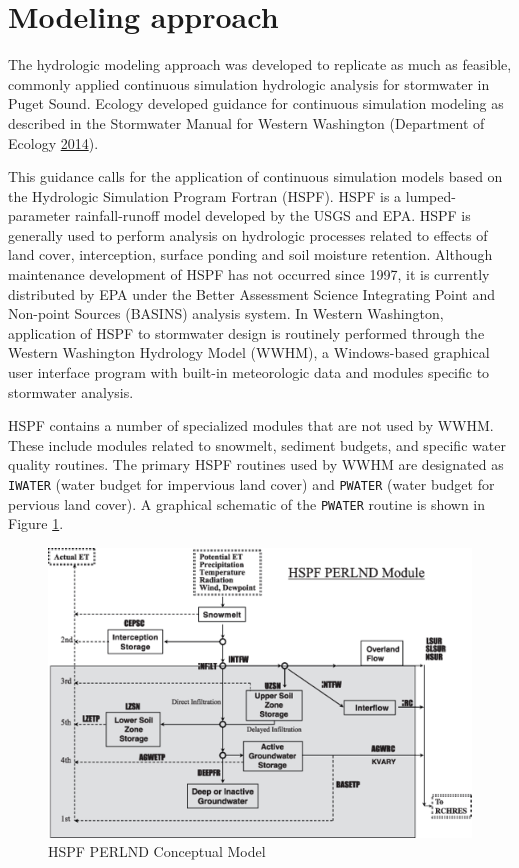 \documentclass[
]{report}
\begin{document}
\hypertarget{modeling-approach}{%
\section{Modeling approach}\label{modeling-approach}}

The hydrologic modeling approach was developed to replicate as much as feasible, commonly applied continuous simulation hydrologic analysis for stormwater in Puget Sound. Ecology developed guidance for continuous simulation modeling as described in the Stormwater Manual for Western Washington (Department of Ecology \protect\hyperlink{ref-DepartmentofEcology2014}{2014}).

This guidance calls for the application of continuous simulation models based on the Hydrologic Simulation Program Fortran (HSPF). HSPF is a lumped-parameter rainfall-runoff model developed by the USGS and EPA. HSPF is generally used to perform analysis on hydrologic processes related to effects of land cover, interception, surface ponding and soil moisture retention. Although maintenance development of HSPF has not occurred since 1997, it is currently distributed by EPA under the Better Assessment Science Integrating Point and Non-point Sources (BASINS) analysis system. In Western Washington, application of HSPF to stormwater design is routinely performed through the Western Washington Hydrology Model (WWHM), a Windows-based graphical user interface program with built-in meteorologic data and modules specific to stormwater analysis.

HSPF contains a number of specialized modules that are not used by WWHM. These include modules related to snowmelt, sediment budgets, and specific water quality routines. The primary HSPF routines used by WWHM are designated as \texttt{IWATER} (water budget for impervious land cover) and \texttt{PWATER} (water budget for pervious land cover). A graphical schematic of the \texttt{PWATER} routine is shown in Figure \ref{fig:hspfFig}.

\begin{figure}[H]
\includegraphics[width=7.33in]{images/hspf_perlnd} \caption{HSPF PERLND Conceptual Model}\label{fig:hspfFig}
\end{figure}
\end{document}
